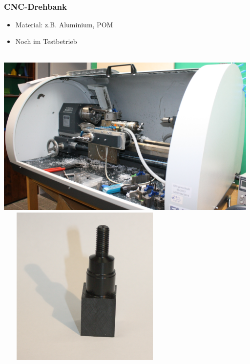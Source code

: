 \documentclass[t]{beamer}
\begin{document}
\begin{frame}
	\frametitle{CNC-Drehbank}
	\begin{itemize}
		\item Material: z.B. Aluminium, POM
		\item Noch im Testbetrieb
	\end{itemize}
		\begin{center}
	~\\
		\includegraphics[height=8cm]{../img/drehbank.png}
		~~~
		\includegraphics[height=8cm]{../img/drehstueck.png}
	\end{center}
\end{frame}
\end{document}
